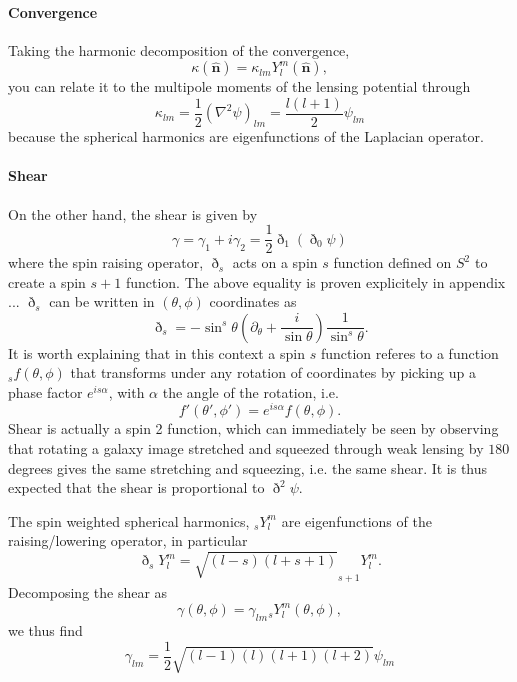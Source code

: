 \documentclass[11pt]{article} %
\begin{document}
\paragraph{Convergence}

Taking the harmonic decomposition of the convergence,
\begin{equation}
    \kappa(\hat{\mathbf n}) = \kappa_{lm}Y_l^m(\hat{\mathbf n}),
\end{equation}
you can relate it to the multipole moments of the lensing potential through
\begin{equation}
    \kappa_{lm} = \frac{1}{2}(\nabla^2\psi)_{lm} = \frac{l(l+1)}{2}\psi_{lm}
\end{equation}
because the spherical harmonics are eigenfunctions of the Laplacian operator.

\paragraph{Shear}
On the other hand, the shear is given by
\begin{equation}
    \gamma = \gamma_1 + i\gamma_2 = \frac{1}{2}\eth_1(\eth_0\psi)
\end{equation}
where the spin raising operator, $\eth_s$ acts on a spin $s$ function defined on $S^2$ to create a spin $s+1$ function. The above equality is proven explicitely in appendix ... %
$\eth_s$ can be written in $(\theta, \phi)$ coordinates as
\begin{equation}
    \eth_s = -\sin^s\theta(\partial_\theta + \frac{i}{\sin\theta})\frac{1}{\sin^s\theta}.
\end{equation}
It is worth explaining that in this context a spin $s$ function referes to a function $_sf(\theta, \phi)$ that transforms under any rotation of coordinates by picking up a phase factor $e^{is\alpha}$, with $\alpha$ the angle of the rotation, i.e.
\begin{equation}
    f'(\theta', \phi') = e^{is\alpha}f(\theta, \phi).
\end{equation}
Shear is actually a spin 2 function, which can immediately be seen by observing that rotating a galaxy image stretched and squeezed through weak lensing by $180$ degrees gives the same stretching and squeezing, i.e. the same shear. It is thus expected that the shear is proportional to $\eth^2\psi$. 

The spin weighted spherical harmonics, $_sY_l^m$ are eigenfunctions of the raising/lowering operator, in particular
\begin{equation}
    \eth_sY_l^m = \sqrt{(l-s)(l+s+1)} _{s+1}Y_l^m.
\end{equation}
Decomposing the shear as
\begin{equation}
    \gamma(\theta, \phi) = \gamma_{lm} {}_sY_l^m(\theta,\phi),
\end{equation}
we thus find
\begin{equation}
    \gamma_{lm} = \frac{1}{2}\sqrt{(l-1)(l)(l+1)(l+2)} \psi_{lm}
\end{equation}
\end{document}
